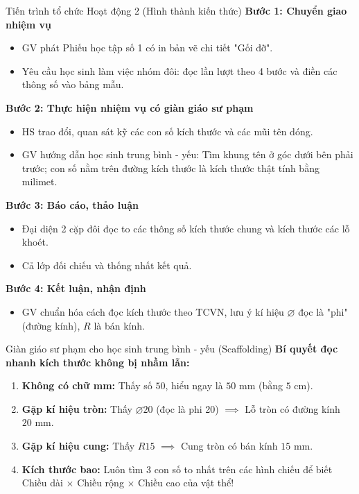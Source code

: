 \documentclass[12pt, a4paper]{article}
\begin{document}
\begin{pedabox}{Tiến trình tổ chức Hoạt động 2 (Hình thành kiến thức)}
    \textbf{Bước 1: Chuyển giao nhiệm vụ}
    \begin{itemize}[leftmargin=0.6cm]
        \item GV phát Phiếu học tập số 1 có in bản vẽ chi tiết "Gối đỡ".
        \item Yêu cầu học sinh làm việc nhóm đôi: đọc lần lượt theo 4 bước và điền các thông số vào bảng mẫu.
    \end{itemize}

    \textbf{Bước 2: Thực hiện nhiệm vụ có giàn giáo sư phạm}
    \begin{itemize}[leftmargin=0.6cm]
        \item HS trao đổi, quan sát kỹ các con số kích thước và các mũi tên dóng.
        \item GV hướng dẫn học sinh trung bình - yếu: Tìm khung tên ở góc dưới bên phải trước; con số nằm trên đường kích thước là kích thước thật tính bằng milimet.
    \end{itemize}

    \textbf{Bước 3: Báo cáo, thảo luận}
    \begin{itemize}[leftmargin=0.6cm]
        \item Đại diện 2 cặp đôi đọc to các thông số kích thước chung và kích thước các lỗ khoét.
        \item Cả lớp đối chiếu và thống nhất kết quả.
    \end{itemize}

    \textbf{Bước 4: Kết luận, nhận định}
    \begin{itemize}[leftmargin=0.6cm]
        \item GV chuẩn hóa cách đọc kích thước theo TCVN, lưu ý kí hiệu $\varnothing$ đọc là "phi" (đường kính), $R$ là bán kính.
    \end{itemize}
\end{pedabox}

\begin{scaffoldbox}{Giàn giáo sư phạm cho học sinh trung bình - yếu (Scaffolding)}
    \textbf{Bí quyết đọc nhanh kích thước không bị nhầm lẫn:}
    \begin{enumerate}[leftmargin=0.6cm]
        \item \textbf{Không có chữ mm:} Thấy số $50$, hiểu ngay là $50\text{ mm}$ (bằng $5\text{ cm}$).
        \item \textbf{Gặp kí hiệu tròn:} Thấy $\varnothing 20$ (đọc là phi 20) $\implies$ Lỗ tròn có đường kính $20\text{ mm}$.
        \item \textbf{Gặp kí hiệu cung:} Thấy $R15$ $\implies$ Cung tròn có bán kính $15\text{ mm}$.
        \item \textbf{Kích thước bao:} Luôn tìm 3 con số to nhất trên các hình chiếu để biết Chiều dài $\times$ Chiều rộng $\times$ Chiều cao của vật thể!
    \end{enumerate}
\end{scaffoldbox}
\end{document}
